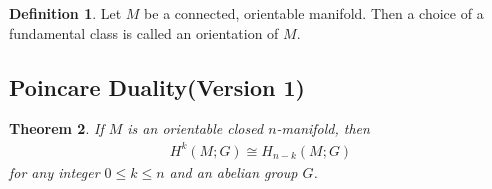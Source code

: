 \documentclass[psamsfonts]{amsart}
\newtheorem{thm}{Theorem}[section]
\theoremstyle{definition}
\newtheorem{defn}[thm]{Definition}
\theoremstyle{remar}
\numberwithin{equation}{section}
\begin{document}
\begin{defn}
  Let $M$ be a connected, orientable manifold.
  Then a choice of a fundamental class is called an orientation of $M$.
\end{defn}

\subsection{Poincare Duality(Version 1)}

\begin{thm}\label{poincare_duality_1}
  If $M$ is an orientable closed $n$-manifold, then
  \begin{align*}
    H^k(M; G) \cong H_{n - k}(M; G)
  \end{align*}
  for any integer $0 \leq k \leq n$ and an abelian group $G$.
\end{thm}
\end{document}
